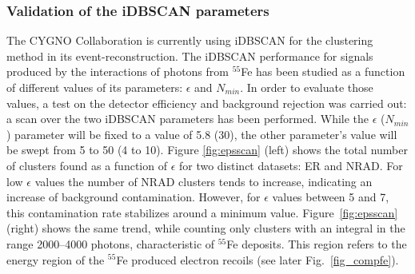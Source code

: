 \documentclass[a4paper,11pt]{article}
\begin{document}



\subsubsection{Validation of the iDBSCAN parameters}\label{idbscan_vali}

The CYGNO Collaboration is currently using iDBSCAN for the clustering method in its event-reconstruction.
The iDBSCAN performance for signals produced by the interactions of photons from $^{55}$Fe has been studied as a function of different values of its parameters: $\epsilon$ and $N_{min}$.
In order to evaluate those values, a test on the detector efficiency and background rejection was carried out: a scan over the two iDBSCAN parameters has been performed.
While the $\epsilon$ ($N_{min}$) parameter will be fixed to a value of 5.8 (30), the other parameter's value will be swept from 5 to 50 (4 to 10). 
Figure \ref{fig:epsscan} (left) shows the total number of clusters found as a function of $\epsilon$ for two distinct datasets: ER and NRAD.
For low $\epsilon$ values the number of NRAD clusters tends to increase, indicating an increase of background contamination. However, for $\epsilon$ values between 5 and 7, this contamination rate stabilizes around a minimum value.
Figure~\ref{fig:epsscan} (right) shows the same trend, while counting only clusters with an integral in the range 2000–4000 photons, characteristic of $^{55}$Fe deposits. This region refers to the energy region of the $^{55}$Fe produced electron recoils (see later Fig.~\ref{fig_compfe}).
\end{document}
